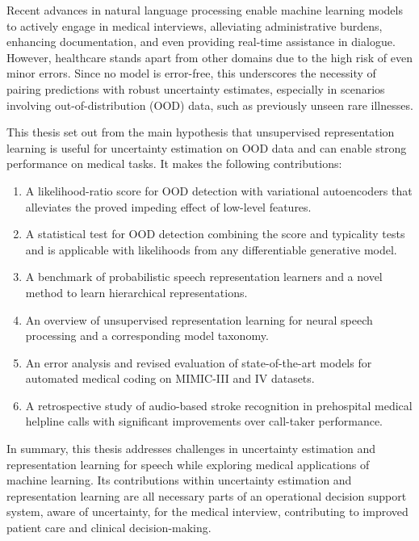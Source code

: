 Recent advances in natural language processing enable machine learning models to actively engage in medical interviews, alleviating administrative burdens, enhancing documentation, and even providing real-time assistance in dialogue.
However, healthcare stands apart from other domains due to the high risk of even minor errors. Since no model is error-free, this underscores the necessity of pairing predictions with robust uncertainty estimates, especially in scenarios involving out-of-distribution (OOD) data, such as previously unseen rare illnesses. 

This thesis set out from the main hypothesis that unsupervised representation learning is useful for uncertainty estimation on OOD data and can enable strong performance on medical tasks. 
It makes the following contributions:
%
\begin{enumerate}[topsep=3pt, partopsep=0pt, itemsep=3pt, parsep=0pt, leftmargin=2em, label=(\alph*)] %
    \item A likelihood-ratio score for OOD detection with variational autoencoders that alleviates the proved impeding effect of low-level features.
    \item A statistical test for OOD detection combining the score and typicality tests and is applicable with likelihoods from any differentiable generative model.
    \item A benchmark of probabilistic speech representation learners and a novel method to learn hierarchical representations.
    \item An overview of unsupervised representation learning for neural speech processing and a corresponding model taxonomy.
    \item An error analysis and revised evaluation of state-of-the-art models for automated medical coding on MIMIC-III and IV datasets. 
    \item A retrospective study of audio-based stroke recognition in prehospital medical helpline calls with significant improvements over call-taker performance.
\end{enumerate}
%
In summary, this thesis addresses challenges in uncertainty estimation and representation learning for speech while exploring medical applications of machine learning.
Its contributions within uncertainty estimation and representation learning are all necessary parts of an operational decision support system, aware of uncertainty, for the medical interview, contributing to improved patient care and clinical decision-making.



